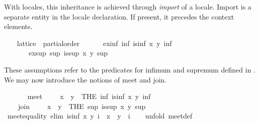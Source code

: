 \begin{isabellebody}
\begin{isamarkuptext}
  With locales, this inheritance is achieved through \emph{import} of a
  locale.  Import is a separate entity in the locale declaration.  If
  present, it precedes the context elements.%
\end{isamarkuptext}%
\isamarkuptrue%
\ \ \isamarkupfalse%
\ lattice\ {\isacharequal}\ partial{\isacharunderscore}order\ {\isacharplus}\isanewline
\ \ \ \ \ ex{\isacharunderscore}inf{\isacharcolon}\ {\isachardoublequoteopen}{\isasymexists}inf{\isachardot}\ is{\isacharunderscore}inf\ x\ y\ inf{\isachardoublequoteclose}\isanewline
\ \ \ \ \ \ \ ex{\isacharunderscore}sup{\isacharcolon}\ {\isachardoublequoteopen}{\isasymexists}sup{\isachardot}\ is{\isacharunderscore}sup\ x\ y\ sup{\isachardoublequoteclose}\isanewline
\ \ %
\begin{isamarkuptext}%
These assumptions refer to the predicates for infimum
  and supremum defined in .  We may now introduce
  the notions of meet and join.%
\end{isamarkuptext}%
\isamarkuptrue%
\ \ \isamarkupfalse%
\isanewline
\ \ \ \ meet\ {\isacharparenleft}\ {\isachardoublequoteopen}{\isasymsqinter}{\isachardoublequoteclose}\ {}{}{\isacharparenright}\ \ {\isachardoublequoteopen}x\ {\isasymsqinter}\ y\ {\isacharequal}\ {\isacharparenleft}THE\ inf{\isachardot}\ is{\isacharunderscore}inf\ x\ y\ inf{\isacharparenright}{\isachardoublequoteclose}\isanewline
\isanewline
\ \ \isamarkupfalse%
\isanewline
\ \ \ \ join\ {\isacharparenleft}\ {\isachardoublequoteopen}{\isasymsqunion}{\isachardoublequoteclose}\ {}{}{\isacharparenright}\ \ {\isachardoublequoteopen}x\ {\isasymsqunion}\ y\ {\isacharequal}\ {\isacharparenleft}THE\ sup{\isachardot}\ is{\isacharunderscore}sup\ x\ y\ sup{\isacharparenright}{\isachardoublequoteclose}\isanewline
%
\isadeliminvisible
\isanewline
\ \ %
\endisadeliminvisible
%
\isataginvisible
{}\isamarkupfalse%
\ meet{\isacharunderscore}equality\ {\isacharbrackleft}elim{\isacharquery}{\isacharbrackright}{\isacharcolon}\ {\isachardoublequoteopen}is{\isacharunderscore}inf\ x\ y\ i\ {\isasymLongrightarrow}\ x\ {\isasymsqinter}\ y\ {\isacharequal}\ i{\isachardoublequoteclose}\isanewline
\ \ \isamarkupfalse%
\ {\isacharparenleft}unfold\ meet{\isacharunderscore}def{\isacharparenright}\isanewline
\ \ \ \ \isamarkupfalse%

\end{isabellebody}
